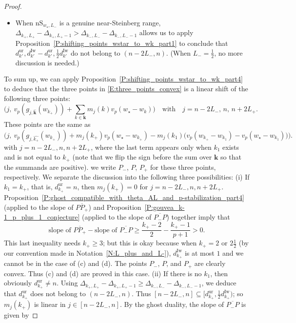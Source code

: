 \begin{proof}
\begin{itemize}
    \item
    When ${\mathrm{nS}}_{w_\star, L_-}$ is a genuine near-Steinberg range, $\Delta_{k_+, L_+} - \Delta_{k_+, L_+-1} > \Delta_{k_-, L_-} - \Delta_{k_-, L_--1}$ allows us to apply Proposition~\ref{P:shifting_points_wstar_to_wk_part1} to conclude that $d_{k'}^{\mathrm{ur}}, d_{k'}^{{\mathrm{Iw}}}-d_{k'}^{{\mathrm{ur}}}, \frac 12d_{k'}^{\mathrm{Iw}}$ do not belong to $(n-2L_-, n)$.
    (When $L_- = \frac 12$, no more discussion is needed.)
    \end{itemize}
    To sum up, we can apply Proposition~\ref{P:shifting_points_wstar_to_wk_part4} to deduce that the three points in \eqref{E:three_points_convex} is a linear
    shift of the following three points:
    $$
    \Big( j,\ v_p(g_{j, \hat{{\mathbf{k}}}}(w_{k_+})) + \sum_{k \in {\mathbf{k}}} m_j(k) v_p(w_\star-w_k)\Big)\quad \textrm{with} \quad j= n-2L_-,\,n,\, n+2L_+.
    $$
    These points are the same as
    \begin{equation}
    \label{E:vertex_three_points_after_shift}\Big( j,\ v_p(g_{j, \hat{ k_+}}(w_{k_+})) + m_j(k_+)v_p(w_\star-w_{k_+}) - m_j(k_1)\big(v_p(w_{k_+}-w_{k_1})- v_p(w_\star-w_{k_1})  \big)\Big).
    \end{equation}
    with $j = n-2L_-, n, n+2L_+$, where the last term appears only when $k_1$ exists and is not equal to $k_+$ (note that we flip the sign before the sum over ${\mathbf{k}}$ so that the summands are positive). we write $P_-$, $P$, $P_+$ for these three points, respectively.
    We separate the discussion into the following three possibilities:
    (i)
    If $k_1=k_+$, that is, $d_{k_+}^{\mathrm{ur}}= n$, then $m_j(k_+) = 0$ for $j = n-2L_-, n, n+2L_+$.
    Proposition~\ref{P:ghost_compatible_with_theta_AL_and_p-stabilization_part4} (applied to the slope of $\overline{PP_+}$) and Proposition~\ref{P:gouvea_k-1_p_plus_1_conjecture} (applied to the slope of $\overline{P_-P}$) together imply that
    \[
    \textrm{slope of }\overline{PP_+}  - \textrm{slope of }\overline{P_-P} \geq \frac {k_+-2}{2} -  \frac{k_+-1}{p+1}>0.
    \]
    This last inequality needs $k_+ \geq 3$; but this is okay because when $k_+ = 2 $ or $ 2\frac 12$ (by our convention made in Notation~\ref{N:L_plus_and_L-}), $d_{k_+}^{\mathrm{Iw}}$ is at most $1$ and we cannot be in the case of (c) and (d).
    The points $P_-$, $P$, and $P_+$ are clearly convex. Thus (c) and (d) are proved in this case.
    (ii) If there is no $k_1$, then obviously $d_{k_+}^{\mathrm{ur}}\neq n$. Using $\Delta_{k_+, L_+} - \Delta_{k_+, L_+-1} \geq \Delta_{k_-, L_-} - \Delta_{k_-, L_--1}$, we deduce that $d_{k_+}^{\mathrm{ur}}$ does not belong to $(n-2L_-, n)$. Thus $[n-2L_-, n]\subseteq [d_{k_+}^{\mathrm{ur}}, \tfrac 12 d_{k_+}^{\mathrm{Iw}})$; so $m_j(k_+)$ is linear in $j \in [n-2L_-,n]$. By the ghost duality, the slope of $\overline{P_-P}$ is given by

\end{proof}
